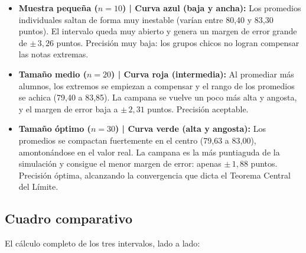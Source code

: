 \begin{itemize}
  \item \textbf{Muestra pequeña ($n = 10$) | Curva azul (baja y ancha):} Los promedios
    individuales saltan de forma muy inestable (varían entre 80,40 y 83,30 puntos). El
    intervalo queda muy abierto y genera un margen de error grande de $\pm\,3{,}26$ puntos.
    Precisión muy baja: los grupos chicos no logran compensar las notas extremas.
  \item \textbf{Tamaño medio ($n = 20$) | Curva roja (intermedia):} Al promediar más alumnos,
    los extremos se empiezan a compensar y el rango de los promedios se achica (79,40 a
    83,85). La campana se vuelve un poco más alta y angosta, y el margen de error baja a
    $\pm\,2{,}31$ puntos. Precisión aceptable.
  \item \textbf{Tamaño óptimo ($n = 30$) | Curva verde (alta y angosta):} Los promedios se
    compactan fuertemente en el centro (79,63 a 83,00), amontonándose en el valor real. La
    campana es la más puntiaguda de la simulación y consigue el menor margen de error: apenas
    $\pm\,1{,}88$ puntos. Precisión óptima, alcanzando la convergencia que dicta el Teorema
    Central del Límite.
\end{itemize}

\subsection{Cuadro comparativo}
El cálculo completo de los tres intervalos, lado a lado:



